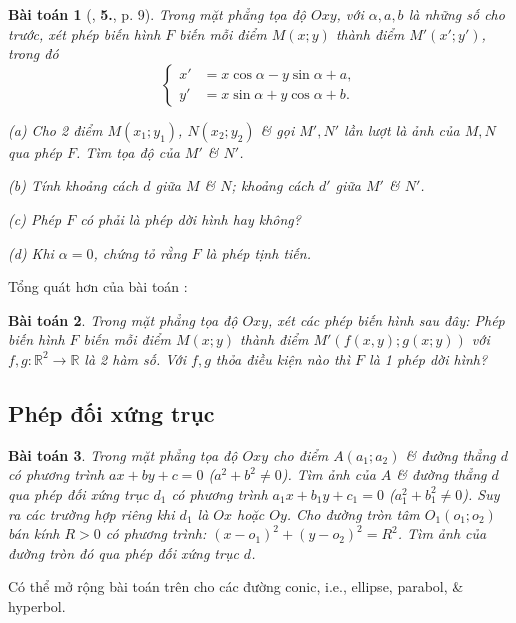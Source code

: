 \documentclass{article}
\numberwithin{equation}{section}
\newtheorem{baitoan}{Bài toán}[section]
\begin{document}
\begin{baitoan}[\cite{SGK_Toan_11_hinh_hoc_nang_cao}, \textbf{5.}, p. 9]
	Trong mặt phẳng tọa độ $Oxy$, với $\alpha,a,b$ là những số cho trước, xét phép biến hình $F$ biến mỗi điểm $M(x;y)$ thành điểm $M'(x';y')$, trong đó
	\begin{equation*}
		\left\{\begin{split}
			x' &= x\cos\alpha - y\sin\alpha + a,\\
			y' &= x\sin\alpha + y\cos\alpha + b.
		\end{split}\right.
	\end{equation*}
	\begin{enumerate*}
		\item[(a)] Cho 2 điểm $M(x_1;y_1)$, $N(x_2;y_2)$ \& gọi $M',N'$ lần lượt là ảnh của $M,N$ qua phép $F$. Tìm tọa độ của $M'$ \& $N'$.
		\item[(b)] Tính khoảng cách $d$ giữa $M$ \& $N$; khoảng cách $d'$ giữa $M'$ \& $N'$.
		\item[(c)] Phép $F$ có phải là phép dời hình hay không?
		\item[(d)] Khi $\alpha = 0$, chứng tỏ rằng $F$ là phép tịnh tiến.
	\end{enumerate*}
\end{baitoan}
Tổng quát hơn của bài toán \cite[\textbf{6.}, p. 9]{SGK_Toan_11_hinh_hoc_nang_cao}:
\begin{baitoan}
	Trong mặt phẳng tọa độ $Oxy$, xét các phép biến hình sau đây: Phép biến hình $F$ biến mỗi điểm $M(x;y)$ thành điểm $M'(f(x,y);g(x;y))$ với $f,g:\mathbb{R}^2\to\mathbb{R}$ là 2 hàm số. Với $f,g$ thỏa điều kiện nào thì $F$ là 1 phép dời hình?
\end{baitoan}


\subsection{Phép đối xứng trục}

\begin{baitoan}
	Trong mặt phẳng tọa độ $Oxy$ cho điểm $A(a_1;a_2)$ \& đường thẳng $d$ có phương trình $ax + by + c = 0$ ($a^2 + b^2\ne 0$). Tìm ảnh của $A$ \& đường thẳng $d$ qua phép đối xứng trục $d_1$ có phương trình $a_1x + b_1y + c_1 = 0$ ($a_1^2 + b_1^2\ne 0$). Suy ra các trường hợp riêng khi $d_1$ là $Ox$ hoặc $Oy$. Cho đường tròn tâm $O_1(o_1;o_2)$ bán kính $R > 0$ có phương trình: $(x - o_1)^2 + (y - o_2)^2 = R^2$. Tìm ảnh của đường tròn đó qua phép đối xứng trục $d$.
\end{baitoan}
Có thể mở rộng bài toán trên cho các đường conic, i.e., ellipse, parabol, \& hyperbol.
\end{document}
